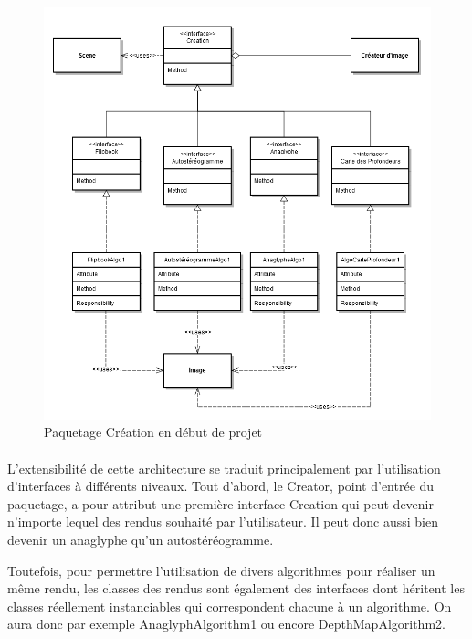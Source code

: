 \begin{figure}[h]
	\centering      
	\includegraphics[scale=0.45]{old_crea.png}
	\caption{\label{fig:creation_cdc} Paquetage Création en début de projet  \protect \footnotemark}
\end{figure}

\paragraph{}
	L'extensibilité de cette architecture se traduit principalement par l'utilisation d'interfaces à différents niveaux. Tout d'abord, le Creator, point d'entrée du paquetage, a pour attribut une première interface Creation qui peut devenir n'importe lequel des rendus souhaité par l'utilisateur. Il peut donc aussi bien devenir un anaglyphe qu'un autostéréogramme. 
	
	Toutefois, pour permettre l'utilisation de divers algorithmes pour réaliser un même rendu, les classes des rendus sont également des interfaces dont héritent les classes réellement instanciables qui correspondent chacune à un algorithme. On aura donc par exemple AnaglyphAlgorithm1 ou encore DepthMapAlgorithm2.
